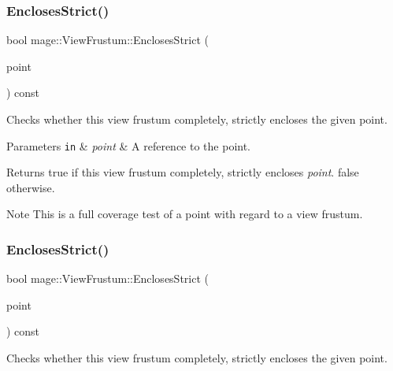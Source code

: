 \subsubsection{\texorpdfstring{Encloses\+Strict()}{EnclosesStrict()}\hspace{0.1cm}{\footnotesize\ttfamily [1/4]}}
{\footnotesize\ttfamily bool mage\+::\+View\+Frustum\+::\+Encloses\+Strict (\begin{DoxyParamCaption}\item[{const \hyperlink{structmage_1_1_point3}{Point3} \&}]{point }\end{DoxyParamCaption}) const\hspace{0.3cm}{\ttfamily [noexcept]}}

Checks whether this view frustum completely, strictly encloses the given point.


\begin{DoxyParams}[1]{Parameters}
\mbox{\tt in}  & {\em point} & A reference to the point. \\
\hline
\end{DoxyParams}
\begin{DoxyReturn}{Returns}
{\ttfamily true} if this view frustum completely, strictly encloses {\itshape point}. {\ttfamily false} otherwise. 
\end{DoxyReturn}
\begin{DoxyNote}{Note}
This is a full coverage test of a point with regard to a view frustum. 
\end{DoxyNote}
\hypertarget{structmage_1_1_view_frustum_a9eaa1d0fcb7e896ff13e2bc7603d613c}{}\label{structmage_1_1_view_frustum_a9eaa1d0fcb7e896ff13e2bc7603d613c} 
\subsubsection{\texorpdfstring{Encloses\+Strict()}{EnclosesStrict()}\hspace{0.1cm}{\footnotesize\ttfamily [2/4]}}
{\footnotesize\ttfamily bool mage\+::\+View\+Frustum\+::\+Encloses\+Strict (\begin{DoxyParamCaption}\item[{F\+X\+M\+V\+E\+C\+T\+OR}]{point }\end{DoxyParamCaption}) const\hspace{0.3cm}{\ttfamily [noexcept]}}

Checks whether this view frustum completely, strictly encloses the given point.


